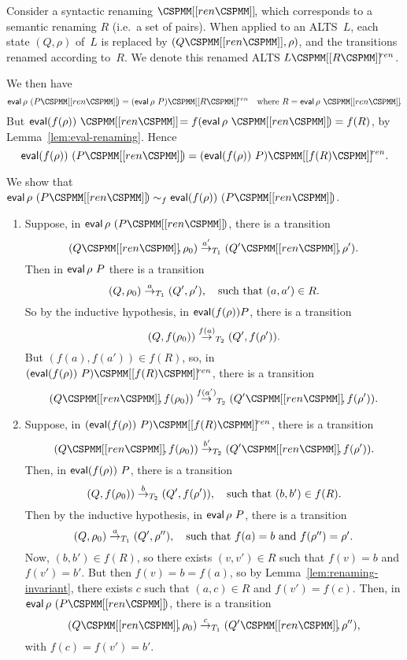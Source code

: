  
Consider a syntactic renaming $\rename{ren}$, which corresponds to a
semantic renaming $R$ (i.e.~a set of pairs).  When applied to an ALTS~$L$, each
state $(Q,\rho)$ of~$L$ is replaced by $(Q\M{[[}ren\M{]]}, \rho)$, and the
transitions renamed according to~$R$.  We denote this renamed ALTS
$L\rename{R}^{ren}$.

We then have
\[
\eval \rho~(P\rename{ren}) = (\eval \rho~ P)\rename{R}^{ren} 
  \quad \mbox{where $R = \eval \rho ~\rename{ren}$}.
\]
But $\eval (f(\rho)) ~\rename{ren} = f(\eval \rho ~\rename{ren}) = f(R)$, by
Lemma~\ref{lem:eval-renaming}.  Hence
\[
\eval (f(\rho))~(P\rename{ren}) = (\eval (f(\rho))~ P)\rename{f(R)}^{ren}.
\]

We show that $\eval \rho~(P\rename{ren}) \bisim_f \eval
(f(\rho))~(P\rename{ren})$.
%
\begin{enumerate}
\item Suppose, in $\eval \rho~(P\rename{ren})$, there is a transition
\[
(Q\rename{ren}, \rho_0) \trans{a'}_{T_1} (Q'\rename{ren}, \rho').
\]
Then in $\mathop{\sf eval} \rho~ P$ there is a transition
\[
(Q, \rho_0) \stackrel{a}{\rightarrow}_{T_1} (Q', \rho'), \quad \mbox{such that $(a,a') \in R$}.
\]
So by the inductive hypothesis, in $\mathop{\sf eval} (f(\rho)) P$, there is a transition 
\[
(Q, f(\rho_0)) \stackrel{f(a)}{\rightarrow}_{T_2} (Q', f(\rho')).
\]
But $(f(a), f(a')) \in f(R)$, so, in 
$(\eval (f(\rho))~ P)\rename{f(R)}^{ren}$, there is a transition
\[
(Q\rename{ren}, f(\rho_0)) \trans{f(a')}_{T_2} (Q'\rename{ren}, f(\rho')).
\]

\item Suppose, in $(\eval (f(\rho))~ P)\rename{f(R)}^{ren}$, there is a
transition 
\[
(Q\rename{ren}, f(\rho_0)) \trans{b'}_{T_2} (Q'\rename{ren}, f(\rho')).
\]
Then, in $\mathop{\sf eval} (f(\rho))~ P$, there is a transition
\[
(Q, f(\rho_0)) \stackrel{b}{\rightarrow}_{T_2} (Q', f(\rho')), 
  \quad \mbox{such that $(b,b') \in f(R)$}.
\]
Then by the inductive hypothesis, in $\mathop{\sf eval} \rho~P$, there is a transition
\[
(Q, \rho_0) \stackrel{a}{\rightarrow}_{T_1} (Q', \rho''), 
  \quad \mbox{such that $f(a) = b$ and $f(\rho'') = \rho'$}.
\]
Now, $(b,b') \in f(R)$, so there exists $(v,v') \in R$ such that $f(v) = b$
and $f(v') = b'$.  But then $f(v) = b =  f(a)$, so by
Lemma~\ref{lem:renaming-invariant}, there exists $c$ such that $(a,c) \in R$
and $f(v') = f(c)$.  Then, in $\eval \rho~(P\rename{ren})$, there is a
transition 
\[
(Q\rename{ren}, \rho_0) \trans{c}_{T_1} (Q'\rename{ren}, \rho''), 
\]
with $f(c) = f(v') = b'$.
\end{enumerate}

